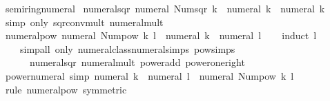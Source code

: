 \begin{isabellebody}
\endisatagproof
{\isafoldproof}%
%
\isadelimproof
\isanewline
%
\endisadelimproof
\isanewline
{}\isamarkupfalse%
\ semiring{\isacharunderscore}{\kern0pt}numeral\isanewline
{}\isanewline
\isanewline
{}\isamarkupfalse%
\ numeral{\isacharunderscore}{\kern0pt}sqr{\isacharcolon}{\kern0pt}\ {\isachardoublequoteopen}numeral\ {\isacharparenleft}{\kern0pt}Num{\isachardot}{\kern0pt}sqr\ k{\isacharparenright}{\kern0pt}\ {\isacharequal}{\kern0pt}\ numeral\ k\ {\isacharasterisk}{\kern0pt}\ numeral\ k{\isachardoublequoteclose}\isanewline
%
\isadelimproof
\ \ %
\endisadelimproof
%
\isatagproof
{}\isamarkupfalse%
\ {\isacharparenleft}{\kern0pt}simp\ only{\isacharcolon}{\kern0pt}\ sqr{\isacharunderscore}{\kern0pt}conv{\isacharunderscore}{\kern0pt}mult\ numeral{\isacharunderscore}{\kern0pt}mult{\isacharparenright}{\kern0pt}%
\endisatagproof
{\isafoldproof}%
%
\isadelimproof
\isanewline
%
\endisadelimproof
\isanewline
{}\isamarkupfalse%
\ numeral{\isacharunderscore}{\kern0pt}pow{\isacharcolon}{\kern0pt}\ {\isachardoublequoteopen}numeral\ {\isacharparenleft}{\kern0pt}Num{\isachardot}{\kern0pt}pow\ k\ l{\isacharparenright}{\kern0pt}\ {\isacharequal}{\kern0pt}\ numeral\ k\ {\isacharcircum}{\kern0pt}\ numeral\ l{\isachardoublequoteclose}\isanewline
%
\isadelimproof
\ \ %
\endisadelimproof
%
\isatagproof
{}\isamarkupfalse%
\ {\isacharparenleft}{\kern0pt}induct\ l{\isacharparenright}{\kern0pt}\isanewline
\ \ \ \ {\isacharparenleft}{\kern0pt}simp{\isacharunderscore}{\kern0pt}all\ only{\isacharcolon}{\kern0pt}\ numeral{\isacharunderscore}{\kern0pt}class{\isachardot}{\kern0pt}numeral{\isachardot}{\kern0pt}simps\ pow{\isachardot}{\kern0pt}simps\isanewline
\ \ \ \ \ \ numeral{\isacharunderscore}{\kern0pt}sqr\ numeral{\isacharunderscore}{\kern0pt}mult\ power{\isacharunderscore}{\kern0pt}add\ power{\isacharunderscore}{\kern0pt}one{\isacharunderscore}{\kern0pt}right{\isacharparenright}{\kern0pt}%
\endisatagproof
{\isafoldproof}%
%
\isadelimproof
\isanewline
%
\endisadelimproof
\isanewline
{}\isamarkupfalse%
\ power{\isacharunderscore}{\kern0pt}numeral\ {\isacharbrackleft}{\kern0pt}simp{\isacharbrackright}{\kern0pt}{\isacharcolon}{\kern0pt}\ {\isachardoublequoteopen}numeral\ k\ {\isacharcircum}{\kern0pt}\ numeral\ l\ {\isacharequal}{\kern0pt}\ numeral\ {\isacharparenleft}{\kern0pt}Num{\isachardot}{\kern0pt}pow\ k\ l{\isacharparenright}{\kern0pt}{\isachardoublequoteclose}\isanewline
%
\isadelimproof
\ \ %
\endisadelimproof
%
\isatagproof
{}\isamarkupfalse%
\ {\isacharparenleft}{\kern0pt}rule\ numeral{\isacharunderscore}{\kern0pt}pow\ {\isacharbrackleft}{\kern0pt}symmetric{\isacharbrackright}{\kern0pt}{\isacharparenright}{\kern0pt}%

\end{isabellebody}

